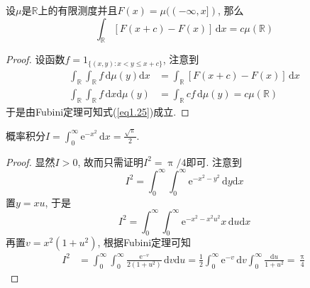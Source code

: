\documentclass[cn, 12pt, math=mtpro2, bibstyle=apa, blue, twocol]{elegantbook}
\newcommand{\R}{\mathbb{R}}
\begin{document}
\begin{example}
设$\mu$是$\R$上的有限测度并且$F(x)=\mu((-\infty,x])$, 那么
\begin{equation}\label{eq1.25}
  \int_{\R}[F(x+c)-F(x)]\,\text{d}x=c\mu(\R)
\end{equation}
\end{example}
\begin{proof}
  设函数$f=1_{\{(x,y):x<y\leq x+c\}}$, 注意到
  \begin{align*}
  \int_{\R}\int_{\R}f\,\text{d}\mu(y)\text{d}x&=\int_{\R}[F(x+c)-F(x)]\,\text{d}x \\
  \int_{\R}\int_{\R}f\,\text{d}x\text{d}\mu(y)&=\int_{\R}cf\,\text{d}\mu(y)=c\mu(\R)
  \end{align*}
  于是由Fubini定理可知式(\ref{eq1.25})成立.
\end{proof}

\begin{example}
概率积分$I=\int_{0}^{\infty}\text{e}^{-x^2}\,\text{d}x=\frac{\sqrt{\uppi}}{2}$.
\end{example}
\begin{proof}
  显然$I>0$, 故而只需证明$I^2=\uppi/4$即可. 注意到
  $$I^2=\int_{0}^{\infty}\int_{0}^{\infty}\text{e}^{-x^2-y^2}\,\text{d}y\text{d}x$$
  置$y=xu$, 于是
  $$I^2=\int_{0}^{\infty}\int_{0}^{\infty}\text{e}^{-x^2-x^2u^2}x\,\text{d}u\text{d}x$$
  再置$v=x^2(1+u^2)$, 根据Fubini定理可知
  \begin{align*}
  I^2&=\int_{0}^{\infty}\int_{0}^{\infty}\frac{\text{e}^{-v}}{2(1+u^2)}\,\text{d}v\text{d}u=\frac{1}{2}\int_{0}^{\infty}\text{e}^{-v}\,\text{d}v\int_{0}^{\infty}\frac{\text{d}u}{1+u^2}=\frac{\uppi}{4}
  \end{align*}
\end{proof}
\end{document}

